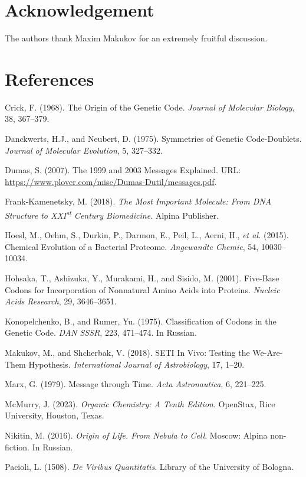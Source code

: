 \documentclass[12pt]{article}
\begin{document}
\section*{Acknowledgement}

The authors thank Maxim Makukov for an extremely fruitful discussion.


\section*{References}

\begin{description}
\item Crick, F. (1968). The Origin of the Genetic Code. \textit{Journal of Molecular Biology}, 38, 367--379.
\item Danckwerts, H.J., and Neubert, D. (1975). Symmetries of Genetic Code-Doublets. \textit{Journal of Molecular Evolution}, 5, 327--332.
\item Dumas, S. (2007). The 1999 and 2003 Messages Explained. URL: \url{https://www.plover.com/misc/Dumas-Dutil/messages.pdf}.
\item Frank-Kamenetsky, M. (2018). \textit{The Most Important Molecule: From DNA Structure to XXI\textsuperscript{st} Century Biomedicine}. Alpina Publisher.
\item Hoesl, M., Oehm, S., Durkin, P., Darmon, E., Peil, L., Aerni, H., \textit{et al.} (2015). Chemical Evolution of a Bacterial Proteome. \textit{Angewandte Chemie}, 54, 10030--10034.
\item Hohsaka, T., Ashizuka, Y., Murakami, H., and Sisido, M. (2001). Five-Base Codons for Incorporation of Nonnatural Amino Acids into Proteins. \textit{Nucleic Acids Research}, 29, 3646--3651.
\item Konopelchenko, B., and Rumer, Yu. (1975). Classification of Codons in the Genetic Code. \textit{DAN SSSR}, 223, 471--474. In Russian.
\item Makukov, M., and Shcherbak, V. (2018). SETI In Vivo: Testing the We-Are-Them Hypothesis. \textit{International Journal of Astrobiology}, 17, 1--20.
\item Marx, G. (1979). Message through Time. \textit{Acta Astronautica}, 6, 221--225.
\item McMurry, J. (2023). \textit{Organic Chemistry: A Tenth Edition}. OpenStax, Rice University, Houston, Texas.
\item Nikitin, M. (2016). \textit{Origin of Life. From Nebula to Cell}. Moscow: Alpina non-fiction. In Russian.
\item Pacioli, L. (1508). \textit{De Viribus Quantitatis}. Library of the University of Bologna.

\end{description}
\end{document}
